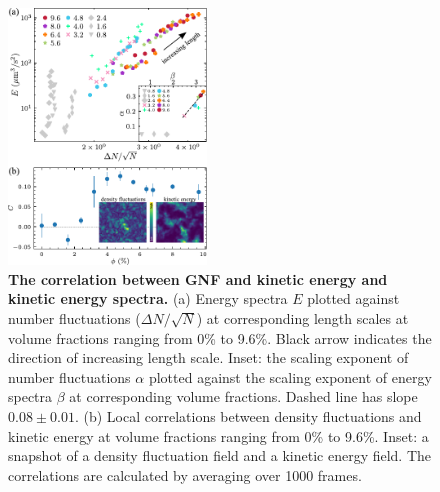 \documentclass[twocolumn,aps,prl,amsmath,amssymb,longbibliography]{revtex4-2}
\begin{document}
\begin{figure}[!]
\begin{center}
\includegraphics[width=0.47\textwidth]{figures/GNF-energy-spectra-correlation/v4.pdf}
\caption[The correlation between GNF and kinetic energy and kinetic energy spectra.]
{
\textbf{The correlation between GNF and kinetic energy and kinetic energy spectra.}
(a) Energy spectra $E$ plotted against number fluctuations ($\Delta N/\sqrt N$) at corresponding length scales at volume fractions ranging from 0\% to 9.6\%. Black arrow indicates the direction of increasing length scale. Inset: the scaling exponent of number fluctuations $\alpha$ plotted against the scaling exponent of energy spectra $\beta$ at corresponding volume fractions. Dashed line has slope $0.08 \pm 0.01$.
(b) Local correlations between density fluctuations and kinetic energy at volume fractions ranging from 0\% to 9.6\%. Inset: a snapshot of a density fluctuation field and a kinetic energy field. The correlations are calculated by averaging over 1000 frames.
}
\label{fig:GNF-energy-spectra-correlation}
\end{center}
\end{figure}
\end{document}
